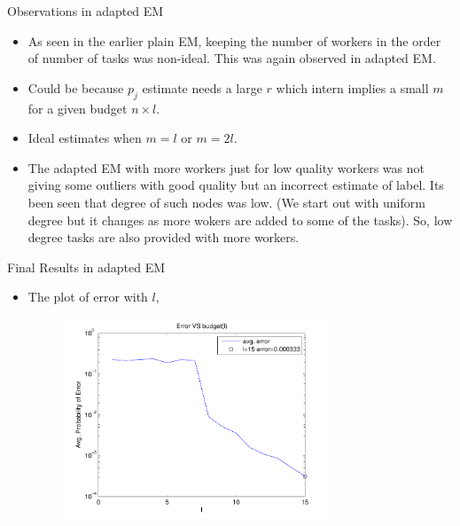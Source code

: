 \documentclass{beamer}
\begin{document}
\begin{frame}{Observations in adapted EM}
    \begin{itemize}
    \item {
    As seen in the earlier plain EM, keeping the number of workers in the order of number of tasks was non-ideal. This was again observed in adapted EM.
    }
    \item {
    Could be because $p_j$ estimate needs a large $r$ which intern implies a small $m$ for a given budget $n\times l$.
    }
    \item {
    Ideal estimates when $m = l$ or $m = 2l$.
    }
    \item {
    The adapted EM with more workers just for low quality workers was not giving some outliers with good quality but an incorrect estimate of label. Its been seen that degree of such nodes was low. (We start out with uniform degree but it changes as more wokers are added to some of the tasks). So, low degree tasks are also provided with more workers.
    }
    \end{itemize}
\end{frame}




\begin{frame}{Final Results in adapted EM}
    \begin{itemize}
    \item {
    The plot of error with $l$,
    \begin{figure}[h!]
   \centering
     \includegraphics[width=0.75\textwidth]{avg_error1.pdf}
\end{figure}
    }
    \end{itemize}
\end{frame}
\end{document}
